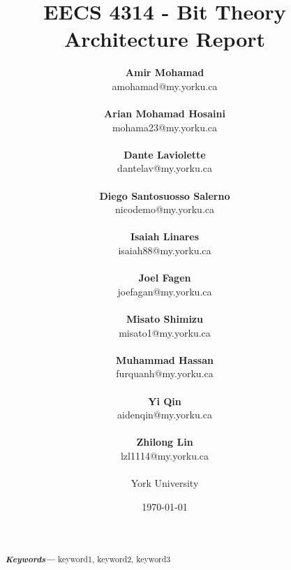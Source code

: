\documentclass[12pt, dvipsnames, a4paper]{article}
\providecommand{\keywords}[1]
{
  \small	
  \textbf{\textit{Keywords---}} #1
}
\begin{document}
\title{\textbf{EECS 4314 - Bit Theory\\Architecture Report}}
\date{\Large \today}
\author{
	\large \textbf{Amir Mohamad}\\ \small amohamad@my.yorku.ca\\\\
	\large \textbf{Arian Mohamad Hosaini}\\ \small mohama23@my.yorku.ca\\\\
	\large \textbf{Dante Laviolette}\\ \small dantelav@my.yorku.ca\\\\
	\large \textbf{Diego Santosuosso Salerno}\\ \small nicodemo@my.yorku.ca\\\\
	\large \textbf{Isaiah Linares}\\ \small isaiah88@my.yorku.ca\\\\
	\large \textbf{Joel Fagen}\\ \small joefagan@my.yorku.ca\\\\
	\large \textbf{Misato Shimizu}\\ \small misato1@my.yorku.ca\\\\
	\large \textbf{Muhammad Hassan}\\ \small furquanh@my.yorku.ca\\\\
	\large \textbf{Yi Qin}\\ \small aidenqin@my.yorku.ca\\\\
	\large \textbf{Zhilong Lin}\\ \small lzl1114@my.yorku.ca\\\\
	\large York University\\
}
\maketitle
\newpage
\hspace{0pt}
\vfill
\begin{abstract}
	\lipsum[1]
	\lipsum[1]
	\\\\
	\keywords{keyword1, keyword2, keyword3}
\end{abstract}
\vfill
\hspace{0pt}
\newpage
\tableofcontents
\clearpage
\end{document}
